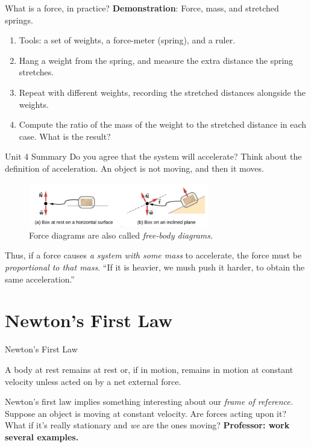 \documentclass{beamer}
\begin{document}
\begin{frame}{What is a force, in practice?}
\textbf{Demonstration}: Force, mass, and stretched springs.
\begin{enumerate}
\item Tools: a set of weights, a force-meter (spring), and a ruler.
\item Hang a weight from the spring, and measure the extra distance the spring stretches.
\item Repeat with different weights, recording the stretched distances alongside the weights.
\item Compute the ratio of the mass of the weight to the stretched distance in each case.  What is the result?
\end{enumerate}
\end{frame}

\begin{frame}{Unit 4 Summary}
\small
Do you agree that the system will accelerate?  Think about the definition of acceleration.  An object is not moving, and then it moves.
\begin{figure}
\centering
\includegraphics[width=0.7\textwidth]{figures/forcesA.png}
\caption{\label{fig:forces1} Force diagrams are also called \textit{free-body diagrams.}}
\end{figure}
Thus, if a force causes \textit{a system with some mass} to accelerate, the force must be \textit{proportional to that mass}.  \alert{``If it is heavier, we mush push it harder, to obtain the same acceleration.''}
\end{frame}

\section{Newton's First Law}

\begin{frame}{Newton's First Law}
\begin{tcolorbox}[colback=white,colframe=red!40!blue,title=Newton's First Law]
\alert{A body at rest remains at rest or, if in motion, remains in motion at constant velocity unless acted on by a net external force.}
\end{tcolorbox}
Newton's first law implies something interesting about our \textit{frame of reference.}  Suppose an object is moving at constant velocity.  Are forces acting upon it?  What if it's really stationary and \textit{we} are the ones moving?  \textbf{Professor: work several examples.}
\end{frame}
\end{document}
